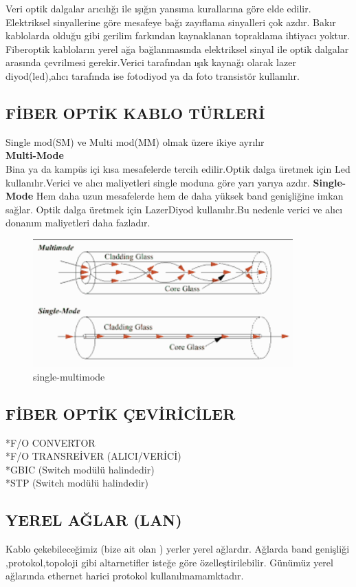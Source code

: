  Veri optik dalgalar arıcılığı ile ışığın yansıma kurallarına göre elde edilir.
 Elektriksel sinyallerine göre mesafeye bağı zayıflama sinyalleri çok azdır.
 Bakır kablolarda olduğu gibi gerilim farkından kaynaklanan topraklama ihtiyacı yoktur.
 Fiberoptik kabloların yerel ağa bağlanmasında elektriksel sinyal ile optik dalgalar arasında çevrilmesi gerekir.Verici tarafından ışık kaynağı olarak lazer diyod(led),alıcı tarafında ise fotodiyod ya da foto transistör kullanılır.
\subsection{FİBER OPTİK KABLO TÜRLERİ}
Single mod(SM) ve Multi mod(MM) olmak üzere ikiye ayrılır\\
\textbf{Multi-Mode}\\
Bina ya da kampüs içi kısa mesafelerde tercih edilir.Optik dalga üretmek için Led kullanılır.Verici ve alıcı maliyetleri single moduna göre yarı yarıya azdır.
\textbf{Single-Mode}
Hem daha uzun mesafelerde hem de daha yüksek band genişliğine imkan sağlar.
Optik dalga üretmek için LazerDiyod kullanılır.Bu nedenle verici ve alıcı donanım maliyetleri daha fazladır.

\begin{figure}[ht]
    \centering
    \includegraphics[width=10cm]{images/single-multimode}
    \caption{single-multimode}
    \label{fig:single_multi_mode}
\end{figure}
\subsection*{FİBER OPTİK ÇEVİRİCİLER}
*F/O CONVERTOR \\
*F/O TRANSREİVER (ALICI/VERİCİ)\\
*GBIC  (Switch modülü halindedir) \\
*STP  (Switch modülü halindedir) \\

\subsection*{YEREL AĞLAR (LAN)}
Kablo çekebileceğimiz (bize ait  olan ) yerler yerel ağlardır.
Ağlarda band genişliği ,protokol,topoloji gibi altarnetifler isteğe göre özelleştirilebilir.
Günümüz yerel ağlarında ethernet harici protokol kullanılmamamktadır.
